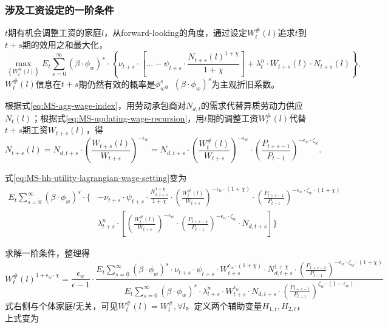\subsubsection{涉及工资设定的一阶条件}
$t$期有机会调整工资的家庭$l$，从forward-looking的角度，通过设定$W_t^{\#}(l)$追求$t$到$t+s$期的效用之和最大化，
\begin{equation}
\label{eq:MS-hh-utility-lagrangian-wage-setting}
\max_{\left\{W_t^{\#}(l)\right\}} E_t \sum_{s=0}^{\infty} \left(\beta \cdot \phi_w \right)^{s} \cdot \left\{\nu_{t+s} \cdot
\left[ \ldots  - \psi_{t+s} \cdot \frac{N_{t+s}(l)^{1+\chi}}{1+\chi}\right]
+ \lambda^n_t \cdot W_{t+s}(l) \cdot N_{t+s}(l)
\right\},
\end{equation}
$W_t^{\#}(l)$信息在$t+s$期仍然有效的概率是$\phi_w^s$。$(\beta \cdot \phi_w)^s$为主观折旧系数。

根据式\eqref{eq:MS-agg-wage-index}，用劳动承包商对$N_{d,t}$的需求代替异质劳动力供应$N_t(l)$；根据式\eqref{eq:MS-updating-wage-recursion}，用$t$期的调整工资$W_t^{\#}(l)$代替$t+s$期工资$W_{t+s}(l)$，得
\begin{equation}
N_{t+s}(l) = N_{d,t+s} \cdot \left(\frac{W_{t+s}(l)}{W_{t+s}}\right)^{- \epsilon_w} = N_{d,t+s} \cdot \left(\frac{W_{t}^{\#}(l)}{W_{t+s}}\right)^{- \epsilon_w} \cdot \left(\frac{P_{t+s-1}}{P_{t-1}}\right)^{- \epsilon_w \cdot \zeta_w}.
\end{equation}

式\eqref{eq:MS-hh-utility-lagrangian-wage-setting}变为
\begin{equation}
\begin{split}
E_t \sum_{s=0}^{\infty} \left(\beta \cdot \phi_w \right)^s \cdot \{ &
  - \nu_{t+s} \cdot \psi_{t+s} \cdot \frac{N_{d,t+s}^{1+\chi}}{1+\chi} \cdot \left(\frac{W_t^{\#}(l)}{W_{t+s}}\right)^{-\epsilon_w \cdot (1+\chi)} \cdot \left(\frac{P_{t+s-1}}{P_{t-1}}\right)^{-\epsilon_w \cdot \zeta_w \cdot (1+\chi)} \\
& \lambda^n_{t+s} \cdot \left[
\left(\frac{W_t^{\#}(l)}{W_{t+s}}\right)^{-\epsilon_w} \cdot
\left(\frac{P_{t+s-1}}{P_{t-1}}\right)^{-\epsilon_w \cdot \zeta_w} \cdot
N_{d,t+s}
\right] \}
\end{split}
\end{equation}

求解一阶条件，整理得
\begin{equation*}
W_t^{\#}(l)^{1+\epsilon_w \cdot \chi}
= \frac{\epsilon_w}{\epsilon -1} \cdot \frac{
  E_t \sum_{s=0}^{\infty} \left(\beta \cdot \phi_w\right)^s \cdot  \nu_{t+s} \cdot \psi_{t+s} \cdot W_{t+s}^{\epsilon_w \cdot (1+\chi)} \cdot N_{d,t+s}^{1+\chi} \cdot \left(\frac{P_{t+s-1}}{P_{t-1}}\right)^{-\epsilon_w \cdot \zeta_w \cdot (1+\chi)}
}{
  E_t \sum_{s=0}^{\infty} \left(\beta \cdot \phi_w\right)^s \cdot  \lambda^n_{t+s} \cdot W_{t+s}^{\epsilon_w} \cdot N_{d,t+s} \cdot \left(\frac{P_{t+s-1}}{P_{t-1}}\right)^{\zeta_w \cdot (1-\epsilon_w)}
}
\end{equation*}
式右侧与个体家庭$l$无关，可见$W_t^{\#}(l) = W_t^{\#}, \forall l$。定义两个辅助变量$H_{1,t}, H_{2,t}$，上式变为

